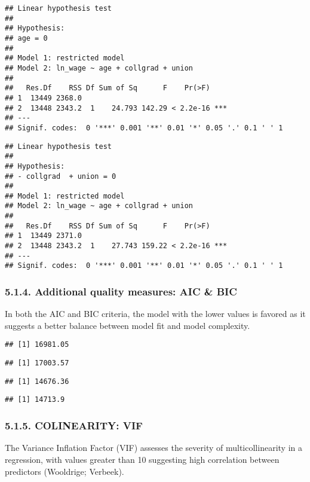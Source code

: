 \documentclass[
]{article}
\begin{document}
\begin{verbatim}
## Linear hypothesis test
## 
## Hypothesis:
## age = 0
## 
## Model 1: restricted model
## Model 2: ln_wage ~ age + collgrad + union
## 
##   Res.Df    RSS Df Sum of Sq      F    Pr(>F)    
## 1  13449 2368.0                                  
## 2  13448 2343.2  1    24.793 142.29 < 2.2e-16 ***
## ---
## Signif. codes:  0 '***' 0.001 '**' 0.01 '*' 0.05 '.' 0.1 ' ' 1
\end{verbatim}

\begin{verbatim}
## Linear hypothesis test
## 
## Hypothesis:
## - collgrad  + union = 0
## 
## Model 1: restricted model
## Model 2: ln_wage ~ age + collgrad + union
## 
##   Res.Df    RSS Df Sum of Sq      F    Pr(>F)    
## 1  13449 2371.0                                  
## 2  13448 2343.2  1    27.743 159.22 < 2.2e-16 ***
## ---
## Signif. codes:  0 '***' 0.001 '**' 0.01 '*' 0.05 '.' 0.1 ' ' 1
\end{verbatim}

\hypertarget{additional-quality-measures-aic-bic}{%
\subsubsection{5.1.4. Additional quality measures: AIC \&
BIC}\label{additional-quality-measures-aic-bic}}

In both the AIC and BIC criteria, the model with the lower values is
favored as it suggests a better balance between model fit and model
complexity.

\begin{verbatim}
## [1] 16981.05
\end{verbatim}

\begin{verbatim}
## [1] 17003.57
\end{verbatim}

\begin{verbatim}
## [1] 14676.36
\end{verbatim}

\begin{verbatim}
## [1] 14713.9
\end{verbatim}

\hypertarget{colinearity-vif}{%
\subsubsection{5.1.5. COLINEARITY: VIF}\label{colinearity-vif}}

The Variance Inflation Factor (VIF) assesses the severity of
multicollinearity in a regression, with values greater than 10
suggesting high correlation between predictors (Wooldrige; Verbeek).
\end{document}
